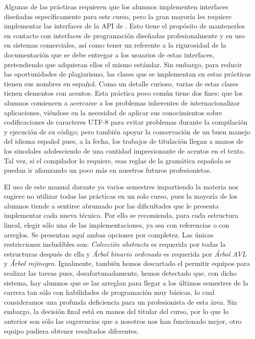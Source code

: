 Algunas de las prácticas requieren que los alumnos implementen interfaces diseñadas específicamente para este curso, pero la gran mayoría les requiere implementar las interfaces de la API de \Java.  Esto tiene el propósito de mantenerlos en contacto con interfaces de programación diseñadas profesionalmente y en uso en sistemas comerciales, así como tener un referente a la rigurosidad de la documentación que se debe entregar a los usuarios de estas interfaces, pretendiendo que adquieran ellos el mismo estándar.  Sin embargo, para reducir las oportunidades de plagiarismo, las clases que se implementan en estas prácticas tienen sus nombres en español.  Como un detalle curioso, varias de estas clases tienen elementos con acentos.  Esta práctica poco común tiene dos fines: que los alumnos comiencen a acercarse a los problemas inherentes de internacionalizar aplicaciones, viéndose en la necesidad de aplicar sus conocimientos sobre codificaciones de caracteres UTF-8 para evitar problemas durante la compilación y ejecución de su código; pero también apoyar la conservación de un buen manejo del idioma español pues, a la fecha, los trabajos de titulación llegan a manos de los sinodales adolesciendo de una cantidad impresionante de acentos en el texto.  Tal vez, si el compilador lo requiere, esas reglas de la gramática española se puedan ir afianzando un poco más en nuestros futuros profesionistas.

El uso de este manual durante ya varios semestres impartiendo la materia nos sugiere no utilizar todas las prácticas en un solo curso, pues la mayoría de los alumnos tiende a sentirse abrumado por las dificultades que le presenta implementar cada nueva técnica.  Por ello se recomienda, para cada estructura lineal, elegir sólo una de las implementaciones, ya sea con referencias o con arreglos.  Se presentan aquí ambas opciones por completez.  Las únicas restricciones ineludibles son: \emph{Colección abstracta} es requerida por todas la estructuras después de ella y \emph{Árbol binario ordenado} es requerida por \emph{Árbol AVL} y \emph{Árbol rojinegro}.  Igualmente, también hemos descartado el permitir equipos para realizar las tareas pues, desafortunadamente, hemos detectado que, con dicho sistema, hay alumnos que se las arreglan para llegar a los últimos semestres de la carrera tan sólo con habilidades de programación muy básicas, lo cual consideramos una profunda deficiencia para un profesionista de esta área.  Sin embargo, la decisión final está en manos del titular del curso, por lo que lo anterior son sólo las sugerencias que a nosotros nos han funcionado mejor, otro equipo pudiera obtener resultados diferentes.

